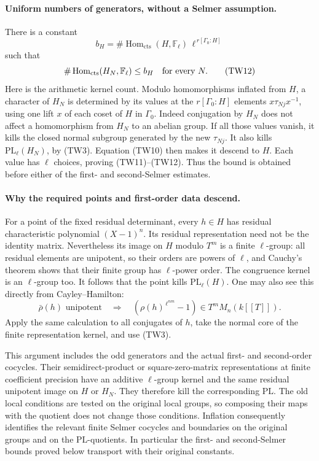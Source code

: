 \paragraph{Uniform numbers of generators, without a Selmer assumption.}
There is a constant
\[
 b_H=
 \#\operatorname{Hom}_{\mathrm{cts}}(H,\mathbb F_\ell)\,
                   \ell^{\,r[\Gamma_0:H]}
 \tag{TW11}
\]
such that
\[
             \#\operatorname{Hom}_{\mathrm{cts}}
                         (H_N,\mathbb F_\ell)\leq b_H
                     \quad\hbox{for every }N.
 \tag{TW12}
\]
Here is the arithmetic kernel count.
Modulo homomorphisms inflated from \(H\), a character of \(H_N\)
is determined by its values at the \(r[\Gamma_0:H]\) elements
\(x\tau_{Nj}x^{-1}\), using one lift \(x\) of each coset
of \(H\) in \(\Gamma_0\).
Indeed conjugation by \(H_N\) does not affect a homomorphism
from \(H_N\) to an abelian group.
If all those values vanish, it kills the closed normal subgroup
generated by the new \(\tau_{Nj}\).
It also kills \(\mathrm{PL}_\ell(H_N)\), by (TW3).
Equation (TW10) then makes it descend to \(H\).
Each value has \(\ell\) choices, proving (TW11)--(TW12).
Thus the bound is obtained before either of the first- and
second-Selmer estimates.

\paragraph{Why the required points and first-order data descend.}
For a point of the fixed residual determinant, every
\(h\in H\) has residual characteristic polynomial \((X-1)^n\).
Its residual representation need not be the identity matrix.
Nevertheless its image on \(H\) modulo \(T^m\) is a finite
\(\ell\)-group: all residual elements are unipotent, so their
orders are powers of \(\ell\), and Cauchy's theorem shows that
their finite group has \(\ell\)-power order.
The congruence kernel is an \(\ell\)-group too.
It follows that the point kills \(\mathrm{PL}_\ell(H)\).
One may also see this directly from Cayley--Hamilton:
\[
 \bar\rho(h)\text{ unipotent}\quad\Longrightarrow\quad
     (\rho(h)^{\,\ell^{nm}}-1)\in T^mM_n(k[[T]]).
 \tag{TW13}
\]
Apply the same calculation to all conjugates of \(h\), take the
normal core of the finite representation kernel, and use (TW3).

This argument includes the odd generators and the actual
first- and second-order cocycles.
Their semidirect-product or square-zero-matrix representations
at finite coefficient precision have an additive
\(\ell\)-group kernel and the same residual unipotent image
on \(H\) or \(H_N\).
They therefore kill the corresponding \(\mathrm{PL}\).
The old local conditions are tested on the original local groups,
so composing their maps with the quotient does not change those
conditions.
Inflation consequently identifies the relevant finite Selmer
cocycles and boundaries on the original groups and on the
\(\mathrm{PL}\)-quotients.
In particular the first- and second-Selmer
bounds proved below transport with their original constants.

